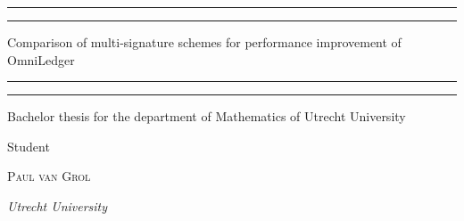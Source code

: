 \documentclass[12pt,a4paper]{report}
\theoremstyle{plain}
\theoremstyle{definition}
\begin{document}
	\begin{titlepage} %
		
		\centering %
		
		\scshape %
		
		
		\rule{\textwidth}{1.6pt}\vspace*{-\baselineskip}\vspace*{2pt} %
		\rule{\textwidth}{0.4pt} %
		
		\vspace{0.75\baselineskip} %
		
		{Comparison of multi-signature schemes for performance improvement of OmniLedger} %
		
		\vspace{0.75\baselineskip} %
		
		\rule{\textwidth}{0.4pt}\vspace*{-\baselineskip}\vspace{3.2pt} %
		\rule{\textwidth}{1.6pt} %
		
		\vspace{2\baselineskip} %
		
		
		Bachelor thesis for the department of Mathematics of Utrecht University %
		
		\vspace*{3\baselineskip} %
		
		
		Student
		
		\vspace{0.5\baselineskip} %
		{\scshape\Large Paul van Grol} %
		
		\vspace{0.5\baselineskip} %
		
		\textit{Utrecht University} %
		

\end{titlepage}
\end{document}
